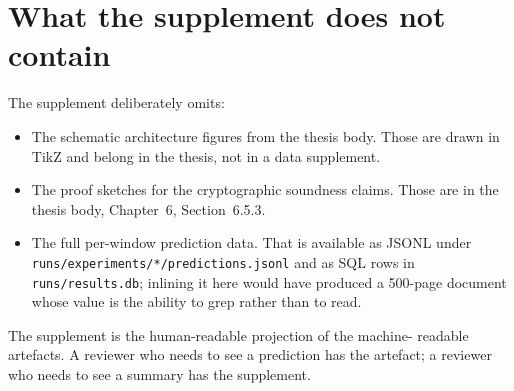\documentclass[11pt,a4paper]{article}
\begin{document}
\section{What the supplement does not contain}

The supplement deliberately omits:

\begin{itemize}
\item The schematic architecture figures from the thesis body. Those
      are drawn in TikZ and belong in the thesis, not in a data
      supplement.
\item The proof sketches for the cryptographic soundness claims.
      Those are in the thesis body, Chapter~6, Section~6.5.3.
\item The full per-window prediction data. That is available as
      JSONL under \texttt{runs/experiments/*/predictions.jsonl} and as
      SQL rows in \texttt{runs/results.db}; inlining it here would
      have produced a 500-page document whose value is the ability
      to grep rather than to read.
\end{itemize}

\noindent
The supplement is the human-readable projection of the machine-
readable artefacts. A reviewer who needs to see a prediction has the
artefact; a reviewer who needs to see a summary has the supplement.
\end{document}
